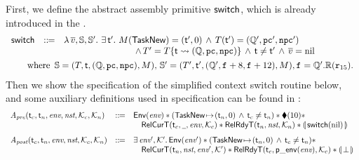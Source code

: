 First, we define the abstract assembly primitive $\mathsf{switch}$, which is 
already introduced in the \Sec{\ref{subsec:High-level Pseudo-SPARCv8 Language}}. 
{
    \small
    $$
    \begin{array}{lcl}
        \primsw & \define & 
        \lambda \, \args{\val}, \hpstate, \hpstate'. \ 
        \exists \, \thrdid'. \ 
        \Mem(\TaskNew) = (\thrdid', 0) \, \land \, 
        \thrdpool(\thrdid') = 
            (\hRstate', \pc', \npc') \\ 
        & & \hspace*{8em} \land \, 
        \thrdpool' = \thrdpool\{ \thrdid \rightsquigarrow 
        (\hRstate, \pc, \npc) \}
        \, \land \, \thrdid \neq \thrdid'
        \, \land \, \args{\val} = \nil \\
        \\[-8pt] 
        \multicolumn{3}{l}
        {
        	\hspace*{1.8em}
            \text{where } \, 
            \hpstate = 
                (\thrdpool, \thrdid, (\hRstate, \pc, \npc), \Mem), \, 
            \hpstate' = 
            (\thrdpool', \thrdid', 
            	(\hRstate', \lab{} + 8, \lab{} + 12), \Mem), \lab{} = \hRstate'.\hRfile(\reg{15}). 
        }
    \end{array}
    $$
}
Then we show the specification of the simplified context switch routine below, and some auxiliary 
definitions used in specification can be found in \Fig{\ref{def:aux-def-spec}}: 
{
    \small
    \[
        \begin{array}{lcl}
            \Apre(\thrdid_c, \thrdid_n, \env, \nst, \hthrdlocalst_c, \hthrdlocalst_n) 
            & \define & 
            \Env{\env} \sepstar
            (\msto{\TaskNew}{(\thrdid_n, 0)} \, \land \, \thrdid_c \neq \thrdid_n) \sepstar 
            \metricAst{10} \sepstar \\
            & & \quad 
            \RelCurT{\thrdid_c}{\notCare}{\env}{\hthrdlocalst_c} \sepstar 
            \RelRdyT{\thrdid_n}{\nst}{\hthrdlocalst_n} \sepstar 
            \safePrimAst{\, \primsw(\nil) \,} \\
            \\[-5pt]
            \Apost(\thrdid_c, \thrdid_n, \env, \nst, \hthrdlocalst_c, \hthrdlocalst_n)
            & \define & \exists \, \env', \hthrdlocalst'. \, \Env{\env'} 
            \sepstar (\msto{\TaskNew}{(\thrdid_n, 0)} \, \land \, \thrdid_c \neq \thrdid_n) 
            \sepstar \\
            & & 
            \quad 
            \RelCurT{\thrdid_n}{\nst}{\env'}{\hthrdlocalst'} \sepstar 
            \RelRdyT{\thrdid_c}{\pEnv{\env}}{\hthrdlocalst_c} \sepstar 
            \safePrimAst{\, \primdone \,}  
        \end{array}
    \]
} 

